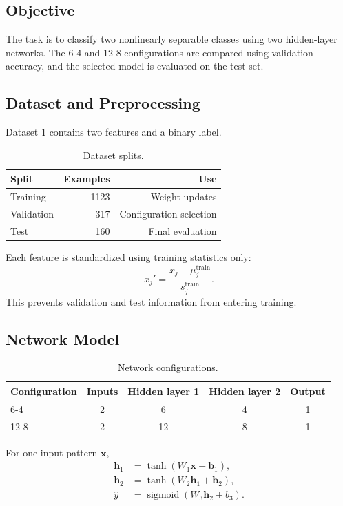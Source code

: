 \documentclass[11pt,a4paper]{article}
\newcommand{\sigmoid}{\operatorname{sigmoid}}
\begin{document}
\subsection{Objective}
The task is to classify two nonlinearly separable classes using two hidden-layer networks. The 6-4 and 12-8 configurations are compared using validation accuracy, and the selected model is evaluated on the test set.

\subsection{Dataset and Preprocessing}

Dataset 1 contains two features and a binary label.

\begin{table}[H]
\centering
\caption{Dataset splits.}
\begin{tabular}{lrr}
\toprule
Split & Examples & Use \\
\midrule
Training & 1123 & Weight updates \\
Validation & 317 & Configuration selection \\
Test & 160 & Final evaluation \\
\bottomrule
\end{tabular}
\end{table}

Each feature is standardized using training statistics only:
\begin{equation}
    x_j'=\frac{x_j-\mu_j^{\text{train}}}{s_j^{\text{train}}}.
\end{equation}
This prevents validation and test information from entering training.

\subsection{Network Model}

\begin{table}[H]
\centering
\caption{Network configurations.}
\begin{tabular}{lcccc}
\toprule
Configuration & Inputs & Hidden layer 1 & Hidden layer 2 & Output \\
\midrule
6-4 & 2 & 6 & 4 & 1 \\
12-8 & 2 & 12 & 8 & 1 \\
\bottomrule
\end{tabular}
\end{table}

For one input pattern $\mathbf{x}$,
\begin{align}
    \mathbf{h}_1 &= \tanh(W_1\mathbf{x}+\mathbf{b}_1),\\
    \mathbf{h}_2 &= \tanh(W_2\mathbf{h}_1+\mathbf{b}_2),\\
    \hat{y} &= \sigmoid(W_3\mathbf{h}_2+b_3).
\end{align}
\end{document}
